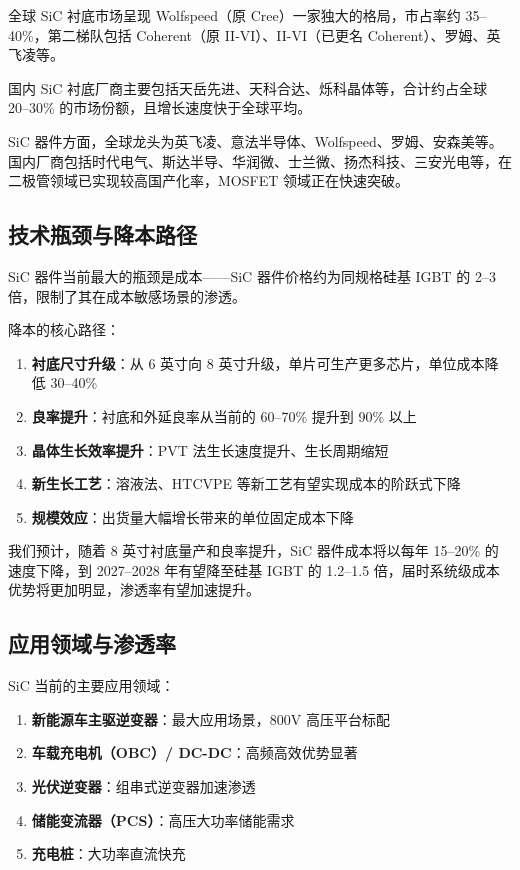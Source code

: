 全球 SiC 衬底市场呈现 Wolfspeed（原 Cree）一家独大的格局，市占率约 35–40\%，第二梯队包括 Coherent（原 II-VI）、II-VI（已更名 Coherent）、罗姆、英飞凌等。

国内 SiC 衬底厂商主要包括天岳先进、天科合达、烁科晶体等，合计约占全球 20–30\% 的市场份额，且增长速度快于全球平均。

SiC 器件方面，全球龙头为英飞凌、意法半导体、Wolfspeed、罗姆、安森美等。国内厂商包括时代电气、斯达半导、华润微、士兰微、扬杰科技、三安光电等，在二极管领域已实现较高国产化率，MOSFET 领域正在快速突破。

\subsection{技术瓶颈与降本路径}

SiC 器件当前最大的瓶颈是成本——SiC 器件价格约为同规格硅基 IGBT 的 2–3 倍，限制了其在成本敏感场景的渗透。

降本的核心路径：
\begin{enumerate}[leftmargin=2em]
\item \textbf{衬底尺寸升级}：从 6 英寸向 8 英寸升级，单片可生产更多芯片，单位成本降低 30–40\%
\item \textbf{良率提升}：衬底和外延良率从当前的 60–70\% 提升到 90\% 以上
\item \textbf{晶体生长效率提升}：PVT 法生长速度提升、生长周期缩短
\item \textbf{新生长工艺}：溶液法、HTCVPE 等新工艺有望实现成本的阶跃式下降
\item \textbf{规模效应}：出货量大幅增长带来的单位固定成本下降
\end{enumerate}

我们预计，随着 8 英寸衬底量产和良率提升，SiC 器件成本将以每年 15–20\% 的速度下降，到 2027–2028 年有望降至硅基 IGBT 的 1.2–1.5 倍，届时系统级成本优势将更加明显，渗透率有望加速提升。

\subsection{应用领域与渗透率}

SiC 当前的主要应用领域：
\begin{enumerate}[leftmargin=2em]
\item \textbf{新能源车主驱逆变器}：最大应用场景，800V 高压平台标配
\item \textbf{车载充电机（OBC）/ DC-DC}：高频高效优势显著
\item \textbf{光伏逆变器}：组串式逆变器加速渗透
\item \textbf{储能变流器（PCS）}：高压大功率储能需求
\item \textbf{充电桩}：大功率直流快充
\end{enumerate}

